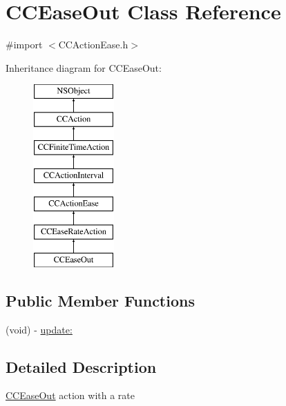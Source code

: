 \hypertarget{interface_c_c_ease_out}{\section{C\-C\-Ease\-Out Class Reference}
\label{interface_c_c_ease_out}
}


{\ttfamily \#import $<$C\-C\-Action\-Ease.\-h$>$}

Inheritance diagram for C\-C\-Ease\-Out\-:\begin{figure}[H]
\begin{center}
\leavevmode
\includegraphics[height=7.000000cm]{interface_c_c_ease_out}
\end{center}
\end{figure}
\subsection*{Public Member Functions}
\begin{DoxyCompactItemize}
\item 
(void) -\/ \hyperlink{interface_c_c_ease_out_a93043577059639678d3dcfee09736c37}{update\-:}
\end{DoxyCompactItemize}


\subsection{Detailed Description}
\hyperlink{interface_c_c_ease_out}{C\-C\-Ease\-Out} action with a rate 

